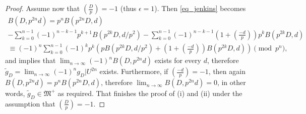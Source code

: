 \documentclass[11pt,letterpaper]{amsart}
\newcommand{\gM}{{\mathfrak M}}
\theoremstyle{remark}
\begin{document}
\begin{proof}
Assume now that  $\left(\frac{D}{p} \right) =-1$ (thus $\epsilon=1$).  Then \eqref{eq_jenkins} becomes
\begin{multline*} 
B(D, p^{2n}d) =  p^nB(p^{2n}D,d)   \\ - \sum_{k=0}^{n-1} (-1)^{n-k-1}p^{k+1}B(p^{2k}D,d/p^2)  -  \sum_{k=0}^{n-1}  (-1)^{n-k-1} \left( 1 + \left( \frac{-d}{p} \right) \right) p^k B(p^{2k}D,d) \\
\equiv (-1)^{n} \sum_{k=0}^{n-1} (-1)^k p^k \left( pB(p^{2k}D,d/p^2) + \left( 1+ \left(\frac{-d}{p} \right) \right)B(p^{2k}D,d) \right) \pmod{p^n},
\end{multline*}
and implies that $\lim_{n \rightarrow \infty} (-1)^nB(D,p^{2n}d)$ exists for every $d$, therefore $\tilde{g}_D= \lim_{n \rightarrow \infty} (-1)^ng_D|U^{2n}$ exists.
Furthermore,  if $ \left( \frac{-d}{p} \right) = -1$, then again $B(D, p^{2n}d) = p^nB(p^{2n}D,d)$, therefore $\lim_{n \rightarrow \infty} B(D, p^{2n}d) =0$,
in other words, $\tilde{g}_D \in \gM^+$ as required. That finishes the proof of (i) and (ii) under the assumption that  $\left(\frac{D}{p} \right) =-1$.
\end{proof}
\end{document}
